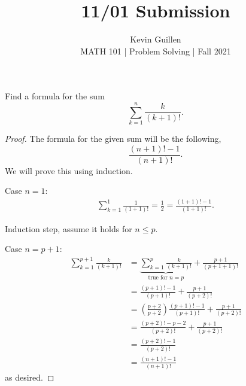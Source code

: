 \documentclass[11pt]{article}
\newenvironment{problem}[2][Problem\!]{\begin{trivlist}
\item[\hskip \labelsep {\bfseries #1}\hskip \labelsep {\bfseries #2}]}{\end{trivlist}}
\renewcommand{\leq}{\leqslant}
\begin{document}
 
\title{11/01 Submission}
\author{Kevin Guillen\\[0.5em]
MATH 101  | Problem Solving | Fall 2021}
\date{} 
\maketitle


\begin{tcolorbox}
    \begin{problem} {IC - 10/22 - 81.}
        Find a formula for the sum \[\sum_{k=1}^{n}\frac{k}{(k+1)!}.\]
    \end{problem}
\end{tcolorbox}
\begin{proof}
    The formula for the given sum will be the following,
    \[\frac{(n+1)!-1}{(n+1)!}.\]
    We will prove this using induction.

    Case $n=1:$
    \begin{align*}
        \sum_{k=1}^{1}\frac{1}{(1+1)! } = \frac{1}{2} = \frac{(1+1)! -1}{(1+1)!}.
    \end{align*}

    Induction step, assume it holds for $n \leq p$.

    Case $n = p+1$:
    \begin{align*}
        \sum_{k =1 }^{p+1}\frac{k}{(k+1)!} &= \underbrace{\sum_{k =1}^{p}\frac{k}{(k+1)!}}_{\text{true for }n=p} + \frac{p+1}{(p+1+1)!} \\
        &= \frac{(p+1)!-1}{(p+1)!} + \frac{p+1}{(p+2)!} \\
        &= \left(\frac{p+2}{p+2}\right)\frac{(p+1)!-1}{(p+1)!} + \frac{p+1}{(p+2)!} \\
        &= \frac{(p+2)! -p -2}{(p+2)!} + \frac{p+1}{(p+2)!} \\
        &= \frac{(p+2)! -1}{(p+2)!}\\
        &= \frac{(n+1)!-1}{(n+1)!}
    \end{align*}
    as desired. 
\end{proof}
\end{document}
